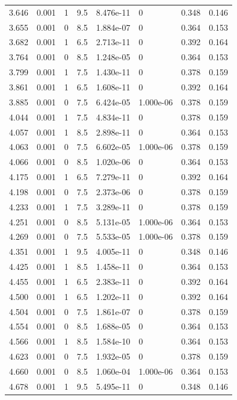 \documentclass[preview]{standalone}
\begin{document}
{{{\begin{tabular}{L{1.2cm}C{1.2cm} C{0.3cm}C{0.5cm} C{1.4cm}C{1.4cm} C{1.4cm}C{1.4cm}}
  3.646  &  0.001  & 1     & 9.5 &  8.476e-11  & 0  & 0.348 &  0.146   \\ 
  3.655  &  0.001  & 0     & 8.5 &  1.884e-07  & 0  & 0.364 &  0.153   \\ 
  3.682  &  0.001  & 1     & 6.5 &  2.713e-11  & 0  & 0.392 &  0.164   \\ 
  3.764  &  0.001  & 0     & 8.5 &  1.248e-05  & 0  & 0.364 &  0.153   \\ 
  3.799  &  0.001  & 1     & 7.5 &  1.430e-11  & 0  & 0.378 &  0.159   \\ 
  3.861  &  0.001  & 1     & 6.5 &  1.608e-11  & 0  & 0.392 &  0.164   \\ 
  3.885  &  0.001  & 0     & 7.5 &  6.424e-05  & 1.000e-06  & 0.378 &  0.159   \\ 
  4.044  &  0.001  & 1     & 7.5 &  4.834e-11  & 0  & 0.378 &  0.159   \\ 
  4.057  &  0.001  & 1     & 8.5 &  2.898e-11  & 0  & 0.364 &  0.153   \\ 
  4.063  &  0.001  & 0     & 7.5 &  6.602e-05  & 1.000e-06  & 0.378 &  0.159   \\ 
  4.066  &  0.001  & 0     & 8.5 &  1.020e-06  & 0  & 0.364 &  0.153   \\ 
  4.175  &  0.001  & 1     & 6.5 &  7.279e-11  & 0  & 0.392 &  0.164   \\ 
  4.198  &  0.001  & 0     & 7.5 &  2.373e-06  & 0  & 0.378 &  0.159   \\ 
  4.233  &  0.001  & 1     & 7.5 &  3.289e-11  & 0  & 0.378 &  0.159   \\ 
  4.251  &  0.001  & 0     & 8.5 &  5.131e-05  & 1.000e-06  & 0.364 &  0.153   \\ 
  4.269  &  0.001  & 0     & 7.5 &  5.533e-05  & 1.000e-06  & 0.378 &  0.159   \\ 
  4.351  &  0.001  & 1     & 9.5 &  4.005e-11  & 0  & 0.348 &  0.146   \\ 
  4.425  &  0.001  & 1     & 8.5 &  1.458e-11  & 0  & 0.364 &  0.153   \\ 
  4.455  &  0.001  & 1     & 6.5 &  2.383e-11  & 0  & 0.392 &  0.164   \\ 
  4.500  &  0.001  & 1     & 6.5 &  1.202e-11  & 0  & 0.392 &  0.164   \\ 
  4.504  &  0.001  & 0     & 7.5 &  1.861e-07  & 0  & 0.378 &  0.159   \\ 
  4.554  &  0.001  & 0     & 8.5 &  1.688e-05  & 0  & 0.364 &  0.153   \\ 
  4.566  &  0.001  & 1     & 8.5 &  1.584e-10  & 0  & 0.364 &  0.153   \\ 
  4.623  &  0.001  & 0     & 7.5 &  1.932e-05  & 0  & 0.378 &  0.159   \\ 
  4.660  &  0.001  & 0     & 8.5 &  1.060e-04  & 1.000e-06  & 0.364 &  0.153   \\ 
  4.678  &  0.001  & 1     & 9.5 &  5.495e-11  & 0  & 0.348 &  0.146   \\ 
\hline 
\end{tabular} 

}}}
\end{document}
